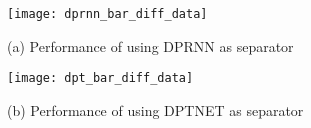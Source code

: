 \begin{comment}
We first conduct experiments to investigate the effectiveness of the proposed Fine-grained Encoding Mechanism and Coarse-to-fine separation framework. To this end, we perform ablation study on four variants of our \emph{SRSSN}:\\
    1) \textbf{Base model}, which has only the coarse phase and thus no Fine-grained Encoding Mechanism is used. It is the same as DPRNN-TASNET~\cite{DPRNN} and we implement it using Asteroid toolkit~\cite{asteroid}.\\2) \textbf{SRSSN-1D}, which has both the coarse and refining phases but no Fine-grained Encoding Mechanism is used. The refining phase has exactly the same model structure as the coarse phase. Thus both two phases encode features in a 1-order latent domain.\\
    3) \textbf{SRSSN-1D-expanded}, which is similar to \textbf{SRSSN-1D} with one difference: the encoding space in the refining phase is expanded by scaling up the number of basis functions in the latent domain.\\
    4) \textbf{SRSSN}, which is our intact model.Figure~\ref{fig:ablation} presents the experimental results of these four variants of our model in two settings with different model complexities.\end{comment}

\begin{figure*}[t]
  \centering
  \begin{minipage}[b]{0.44\linewidth}
    \centering
    \texttt{[image: dprnn\_bar\_diff\_data]}
    \centerline{(a) Performance of using DPRNN as separator}\medskip
  \end{minipage}
  \hspace{0.03\linewidth}
  \begin{minipage}[b]{0.44\linewidth}
    \centering
    \texttt{[image: dpt\_bar\_diff\_data]}
    \centerline{(b) Performance of using DPTNET as separator}\medskip
  \end{minipage}
  \caption{}
  \label{fig:diff_data}
\end{figure*}

